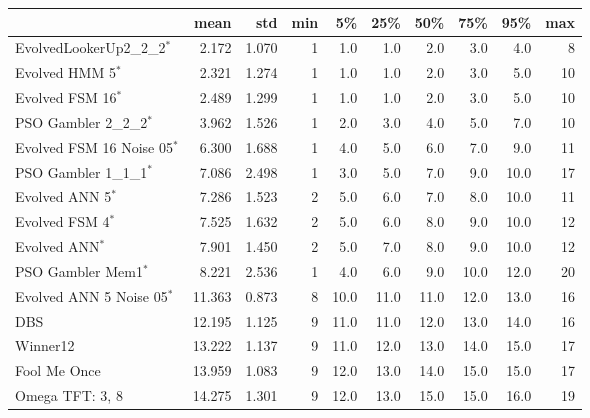 \begin{tabular}{lrrrrrrrrr}
\toprule
{} &    mean &    std &  min &    5\% &   25\% &   50\% &   75\% &   95\% &  max \\
\midrule
EvolvedLookerUp2\_2\_2$^{*}$    &   2.172 &  1.070 &    1 &   1.0 &   1.0 &   2.0 &   3.0 &   4.0 &    8 \\
Evolved HMM 5$^{*}$           &   2.321 &  1.274 &    1 &   1.0 &   1.0 &   2.0 &   3.0 &   5.0 &   10 \\
Evolved FSM 16$^{*}$          &   2.489 &  1.299 &    1 &   1.0 &   1.0 &   2.0 &   3.0 &   5.0 &   10 \\
PSO Gambler 2\_2\_2$^{*}$       &   3.962 &  1.526 &    1 &   2.0 &   3.0 &   4.0 &   5.0 &   7.0 &   10 \\
Evolved FSM 16 Noise 05$^{*}$ &   6.300 &  1.688 &    1 &   4.0 &   5.0 &   6.0 &   7.0 &   9.0 &   11 \\
PSO Gambler 1\_1\_1$^{*}$       &   7.086 &  2.498 &    1 &   3.0 &   5.0 &   7.0 &   9.0 &  10.0 &   17 \\
Evolved ANN 5$^{*}$           &   7.286 &  1.523 &    2 &   5.0 &   6.0 &   7.0 &   8.0 &  10.0 &   11 \\
Evolved FSM 4$^{*}$           &   7.525 &  1.632 &    2 &   5.0 &   6.0 &   8.0 &   9.0 &  10.0 &   12 \\
Evolved ANN$^{*}$             &   7.901 &  1.450 &    2 &   5.0 &   7.0 &   8.0 &   9.0 &  10.0 &   12 \\
PSO Gambler Mem1$^{*}$        &   8.221 &  2.536 &    1 &   4.0 &   6.0 &   9.0 &  10.0 &  12.0 &   20 \\
Evolved ANN 5 Noise 05$^{*}$  &  11.363 &  0.873 &    8 &  10.0 &  11.0 &  11.0 &  12.0 &  13.0 &   16 \\
DBS                           &  12.195 &  1.125 &    9 &  11.0 &  11.0 &  12.0 &  13.0 &  14.0 &   16 \\
Winner12                      &  13.222 &  1.137 &    9 &  11.0 &  12.0 &  13.0 &  14.0 &  15.0 &   17 \\
Fool Me Once                  &  13.959 &  1.083 &    9 &  12.0 &  13.0 &  14.0 &  15.0 &  15.0 &   17 \\
Omega TFT: 3, 8               &  14.275 &  1.301 &    9 &  12.0 &  13.0 &  15.0 &  15.0 &  16.0 &   19 \\
\bottomrule
\end{tabular}
